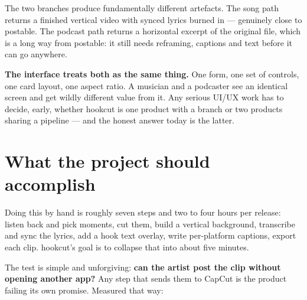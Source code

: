 \documentclass[11pt,a4paper]{article}
\begin{document}
The two branches produce fundamentally different artefacts. The song path
returns a finished vertical video with synced lyrics burned in --- genuinely
close to postable. The podcast path returns a horizontal excerpt of the original
file, which is a long way from postable: it still needs reframing, captions and
text before it can go anywhere.

\textbf{The interface treats both as the same thing.} One form, one set of
controls, one card layout, one aspect ratio. A musician and a podcaster see an
identical screen and get wildly different value from it. Any serious UI/UX work
has to decide, early, whether hookcut is one product with a branch or two
products sharing a pipeline --- and the honest answer today is the latter.

\section{What the project should accomplish}

Doing this by hand is roughly seven steps and two to four hours per release:
listen back and pick moments, cut them, build a vertical background, transcribe
and sync the lyrics, add a hook text overlay, write per-platform captions,
export each clip. hookcut's goal is to collapse that into about five minutes.

The test is simple and unforgiving: \textbf{can the artist post the clip without
opening another app?} Any step that sends them to CapCut is the product failing
its own promise. Measured that way:
\end{document}
